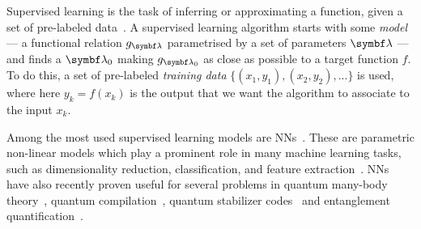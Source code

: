 Supervised learning is the task of inferring or approximating a function, given a set of pre-labeled data~\cite{bishop2006pattern,mohri2012foundations}.
A supervised learning algorithm starts with some \emph{model} --- a functional relation $g_{\bs\lambda}$ parametrised by a set of parameters $\bs\lambda$ --- and finds a $\bs\lambda_0$ making $g_{\bs\lambda_0}$ as close as possible to a target function $f$.
To do this, a set of pre-labeled \emph{training data} $\{ (x_1, y_1), (x_2,y_2), ...\}$ is used,
where here $y_k=f(x_k)$ is the output that we want the algorithm to associate to the input $x_k$.

Among the most used supervised learning models are \acp{NN}~\cite{hechtnielsen1989theory,haykin1998neural}.
These are parametric non-linear models which play a prominent role in many machine learning tasks, such as dimensionality reduction, classification, and feature extraction~\cite{hechtnielsen1989theory,haykin1998neural}.
\acp{NN} have also recently proven useful for several problems in quantum many-body theory~\cite{amin2016quantum,wang2016discovering,hush2017machine,carleo2017solving,carrasquilla2017machine,torlai2017manybody,broecker2017quantum,deng2017quantum},
quantum compilation~\cite{swaddle2017generating}, quantum stabilizer codes~\cite{krastanov2017deep} and entanglement quantification~\cite{gray2017measuring}.

